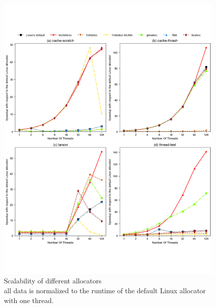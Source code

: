  
\begin{figure}[!ht]
    \centering
    \includegraphics[width=\textwidth]{figure/sythentic-scalobility.pdf}
    \caption{Scalability of different allocators\\  all data is normalized to the runtime of the default Linux allocator with one thread.}
    \label{sythentic-scalability}
\end{figure}

